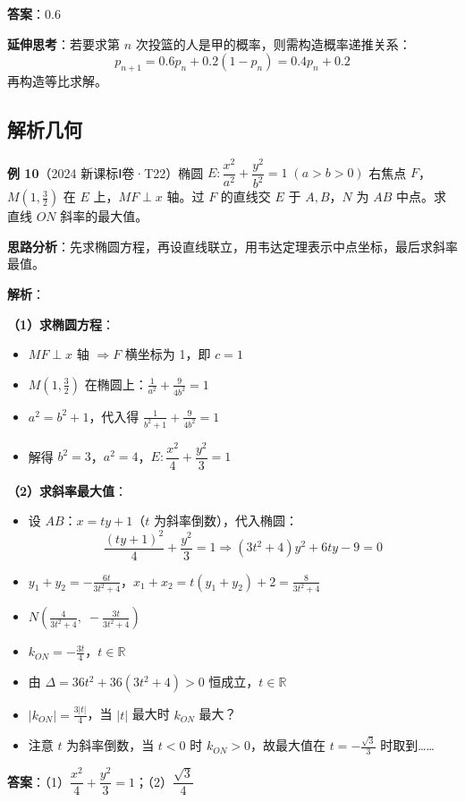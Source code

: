 \textbf{答案}：$\boxed{0.6}$

\textbf{延伸思考}：若要求第 $n$ 次投篮的人是甲的概率，则需构造概率递推关系：
\[
p_{n+1} = 0.6p_n + 0.2(1-p_n) = 0.4p_n + 0.2
\]
再构造等比求解。

\subsection{解析几何}

\textbf{例 10}（2024 新课标Ⅰ卷·T22）椭圆 $E:\dfrac{x^2}{a^2}+\dfrac{y^2}{b^2}=1\;(a>b>0)$ 右焦点 $F$，$M(1,\frac32)$ 在 $E$ 上，$MF\perp x$ 轴。过 $F$ 的直线交 $E$ 于 $A,B$，$N$ 为 $AB$ 中点。求直线 $ON$ 斜率的最大值。

\textbf{思路分析}：先求椭圆方程，再设直线联立，用韦达定理表示中点坐标，最后求斜率最值。

\textbf{解析}：

\textbf{（1）求椭圆方程}：
\begin{itemize}
  \item $MF\perp x$ 轴 $\Rightarrow F$ 横坐标为 1，即 $c=1$
  \item $M(1,\frac32)$ 在椭圆上：$\frac{1}{a^2} + \frac{9}{4b^2} = 1$
  \item $a^2 = b^2 + 1$，代入得 $\frac{1}{b^2+1} + \frac{9}{4b^2} = 1$
  \item 解得 $b^2=3$，$a^2=4$，$E:\dfrac{x^2}{4}+\dfrac{y^2}{3}=1$
\end{itemize}

\textbf{（2）求斜率最大值}：
\begin{itemize}
  \item 设 $AB$：$x=ty+1$（$t$ 为斜率倒数），代入椭圆：
    \[
    \frac{(ty+1)^2}{4} + \frac{y^2}{3} = 1 \Rightarrow (3t^2+4)y^2 + 6ty - 9 = 0
    \]
  \item $y_1+y_2 = -\frac{6t}{3t^2+4}$，$x_1+x_2 = t(y_1+y_2)+2 = \frac{8}{3t^2+4}$
  \item $N\left(\frac{4}{3t^2+4},\;-\frac{3t}{3t^2+4}\right)$
  \item $k_{ON} = -\frac{3t}{4}$，$t\in\mathbb{R}$
  \item 由 $\Delta = 36t^2 + 36(3t^2+4) > 0$ 恒成立，$t\in\mathbb{R}$
  \item $|k_{ON}| = \frac{3|t|}{4}$，当 $|t|$ 最大时 $k_{ON}$ 最大？
  \item 注意 $t$ 为斜率倒数，当 $t<0$ 时 $k_{ON}>0$，故最大值在 $t=-\frac{\sqrt{3}}{3}$ 时取到……
\end{itemize}

\textbf{答案}：（1）$\boxed{\dfrac{x^2}{4}+\dfrac{y^2}{3}=1}$；（2）$\boxed{\dfrac{\sqrt{3}}{4}}$

